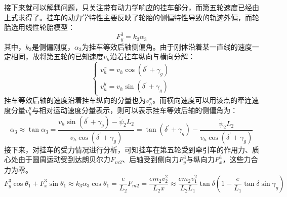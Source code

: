       接下来就可以解耦问题，只关注带有动力学响应的挂车部分，而第五轮速度已经由上式求得了。挂车的动力学特性主要反映了轮胎的侧偏特性导致的轨迹外偏，而轮胎选用线性轮胎模型：
      \begin{equation}
      F_y^3 = k_3 \alpha_3
      \label{eq:156}
      \end{equation}
      \noindent 其中，$k_3$是侧偏刚度，$\alpha_3$为挂车等效后轴侧偏角。由于刚体沿着某一直线的速度一定相同，故将第五轮的已知速度$v_h$沿着挂车纵向与横向分解：
      \begin{equation}
      \begin{cases}
      v_h^x = v_h \cos(\delta^{\prime} + \gamma_{g}) \\
      v_h^y = v_h \sin(\delta^{\prime} + \gamma_{g})
      \end{cases}
      \label{eq:157}
      \end{equation}
      挂车等效后轴的速度沿着挂车纵向的分量也为$v_h^x$。而横向速度可以用该点的牵连速度分量$v_h^y$与相对运动速度分量表示，则可以表示挂车等效后轴的侧偏角为：
      \begin{equation}
      \alpha_3 \approx \tan\alpha_3 = \frac{v_h \sin(\delta^{\prime} + \gamma_{g}) - \dot{\psi}_2 L_2}{v_h \cos(\delta^{\prime} + \gamma_{g})} = \tan(\delta^{\prime} + \gamma_{g}) - \frac{\dot{\psi}_2 L_2}{v_h \cos(\delta^{\prime} + \gamma_{g})}
      \label{eq:158}
      \end{equation}
      接下来，对挂车的受力情况进行分析，可知挂车在第五轮受到牵引车的作用力、质心处由于圆周运动受到达朗贝尔力$F_{m2}$、后轴受到侧向力$F_y^3$与纵向力$F_x^3$，这些力合力为零。
      \begin{equation}
      F_y^3 \cos\theta_1 + F_x^3 \sin\theta_1 \approx k_3 \alpha_3 \cos\theta_1 = \frac{e}{L_2}F_{m2} = \frac{e m_2 v_2^2}{L_2 x} \approx \frac{e m_2 v_1^2}{L_2 L_1} \tan\delta \left( 1 - \frac{e}{L_1} \tan\delta \sin\gamma_{g} \right)
      \label{eq:159}
      \end{equation}


